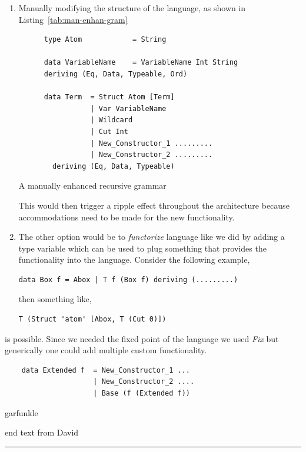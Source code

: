\documentclass[thesis-solanki.tex]{subfiles}
\begin{document}
\begin{enumerate}
\item Manually modifying the structure of the language, as shown in Listing~\ref{tab:man-enhan-gram}
  \begin{code-list}[H]
    \begin{verbatim}
      type Atom            = String

      data VariableName    = VariableName Int String
      deriving (Eq, Data, Typeable, Ord)

      data Term  = Struct Atom [Term]
                 | Var VariableName
                 | Wildcard
                 | Cut Int
                 | New_Constructor_1 .........
                 | New_Constructor_2 .........
        deriving (Eq, Data, Typeable)
    \end{verbatim}
    \caption{A manually enhanced recursive grammar}
    \label{tab:man-enhan-gram}
  \end{code-list}

This would then trigger a ripple effect throughout the architecture because accommodations need to be made for the new functionality.

\item The other option would be to \textit{functorize} language like we did by adding a type variable which can be used to plug something that provides the functionality into the language.
Consider the following example,

\begin{verbatim}
data Box f = Abox | T f (Box f) deriving (.........)
\end{verbatim}

then something like,
\begin{verbatim}
T (Struct 'atom' [Abox, T (Cut 0)])
\end{verbatim}
\end{enumerate}
is possible. Since we needed the fixed point of the language we used \textit{Fix} but generically one could add multiple custom
functionality.

\begin{code-list}[H]
  \begin{verbatim}
    data Extended f  = New_Constructor_1 ...
                     | New_Constructor_2 ....
                     | Base (f (Extended f))
  \end{verbatim}
  \caption{garfunkle}
  \label{tab:garfunkle}
\end{code-list}
\vspace*{-1.5\baselineskip}
\begin{center}
  end text from David\\[-3ex]
  \textcolor{blue}{\rule{0.95\textwidth}{1pt}}
\end{center}
\end{document}
